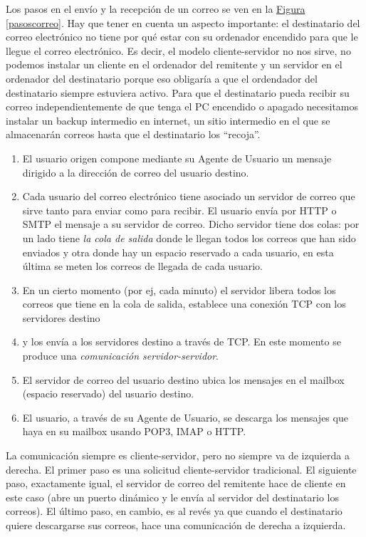 \documentclass[10pt,a4paper,spanish]{report}
\begin{document}
Los pasos en el envío y la recepción de un correo se ven en la \hyperref[pasoscorreo]{Figura \ref*{pasoscorreo}}. Hay que tener en cuenta un aspecto importante: el destinatario del correo electrónico no tiene por qué estar con su ordenador encendido para que le llegue el correo electrónico. Es decir, el modelo cliente-servidor no nos sirve, no podemos instalar un cliente en el ordenador del remitente y un servidor en el ordenador del destinatario porque eso obligaría a que el ordendador del destinatario siempre estuviera activo. Para que el destinatario pueda recibir su correo independientemente de que tenga el PC encendido o apagado necesitamos instalar un backup intermedio en internet, un sitio intermedio en el que se almacenarán correos hasta que el destinatario los ``recoja''.
\begin{enumerate}[1.]
  \item El usuario origen compone mediante su Agente de Usuario un mensaje dirigido a la dirección de correo del usuario destino.
  \item Cada usuario del correo electrónico tiene asociado un servidor de correo que sirve tanto para enviar como para recibir. El usuario envía por HTTP o SMTP el mensaje a su servidor de correo. Dicho servidor tiene dos colas: por un lado tiene \textit{\textcolor{tema2}{la cola de salida}} donde le llegan todos los correos que han sido enviados y otra donde hay un espacio reservado a cada usuario, en esta última se meten los correos de llegada de cada usuario.
  \item En un cierto momento (por ej, cada minuto) el servidor libera todos los correos que tiene en la cola de salida, establece una conexión TCP con los servidores destino
  \item y los envía a los servidores destino a través de TCP. En este momento se produce una \textit{\textcolor{tema2}{comunicación servidor-servidor}}.
  \item El servidor de correo del usuario destino ubica los mensajes en el mailbox (espacio reservado) del usuario destino.
  \item El usuario, a través de su Agente de Usuario, se descarga los mensajes que haya en su mailbox usando POP3, IMAP o HTTP.
\end{enumerate}

La comunicación siempre es cliente-servidor, pero no siempre va de izquierda a derecha. El primer paso es una solicitud cliente-servidor tradicional. El siguiente paso, exactamente igual, el servidor de correo del remitente hace de cliente en este caso (abre un puerto dinámico y le envía al servidor del destinatario los correos). El último paso, en cambio, es al revés ya que cuando el destinatario quiere descargarse sus correos, hace una comunicación de derecha a izquierda.
\end{document}
